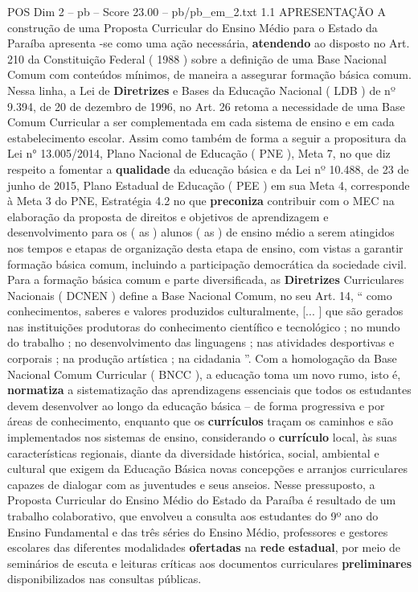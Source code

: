 \begin{textsample}{POS Dim 2 – pb – Score 23.00 – pb/pb\_em\_2.txt}  \label{ex:f2_pos_271}
1.1 APRESENTAÇÃO A construção de uma Proposta Curricular do Ensino Médio para o Estado da Paraíba apresenta -se como uma ação necessária, \textbf{atendendo} ao disposto no Art. 210 da Constituição Federal ( 1988 ) sobre a definição de uma Base Nacional Comum com conteúdos mínimos, de maneira a assegurar formação básica comum.
Nessa linha, a Lei de \textbf{Diretrizes} e Bases da Educação Nacional ( LDB ) de nº 9.394, de 20 de dezembro de 1996, no Art. 26 retoma a necessidade de uma Base Comum Curricular a ser complementada em cada sistema de ensino e em cada estabelecimento escolar.
Assim como também de forma a seguir a propositura da Lei n{\EmojiFont °} 13.005/2014, Plano Nacional de Educação ( PNE ), Meta 7, no que diz respeito a fomentar a \textbf{qualidade} da educação básica e da Lei nº 10.488, de 23 de junho de 2015, Plano Estadual de Educação ( PEE ) em sua Meta 4, corresponde à Meta 3 do PNE, Estratégia 4.2 no que \textbf{preconiza} contribuir com o MEC na elaboração da proposta de direitos e objetivos de aprendizagem e desenvolvimento para os ( as ) alunos ( as ) de ensino médio a serem atingidos nos tempos e etapas de organização desta etapa de ensino, com vistas a garantir formação básica comum, incluindo a participação democrática da sociedade civil.
Para a formação básica comum e parte diversificada, as \textbf{Diretrizes} Curriculares Nacionais ( DCNEN ) define a Base Nacional Comum, no seu Art. 14, “ como conhecimentos, saberes e valores produzidos culturalmente, [... ] que são gerados nas instituições produtoras do conhecimento científico e tecnológico ; no mundo do trabalho ; no desenvolvimento das linguagens ; nas atividades desportivas e corporais ; na produção artística ; na cidadania ”.
Com a homologação da Base Nacional Comum Curricular ( BNCC ), a educação toma um novo rumo, isto é, \textbf{normatiza} a sistematização das aprendizagens essenciais que todos os estudantes devem desenvolver ao longo da educação básica – de forma progressiva e por áreas de conhecimento, enquanto que os \textbf{currículos} traçam os caminhos e são implementados nos sistemas de ensino, considerando o \textbf{currículo} local, às suas características regionais, diante da diversidade histórica, social, ambiental e cultural que exigem da Educação Básica novas concepções e arranjos curriculares capazes de dialogar com as juventudes e seus anseios.
Nesse pressuposto, a Proposta Curricular do Ensino Médio do Estado da Paraíba é resultado de um trabalho colaborativo, que envolveu a consulta aos estudantes do 9º ano do Ensino Fundamental e das três séries do Ensino Médio, professores e gestores escolares das diferentes modalidades \textbf{ofertadas} na \textbf{rede} \textbf{estadual}, por meio de seminários de escuta e leituras críticas aos documentos curriculares \textbf{preliminares} disponibilizados nas consultas públicas.

\end{textsample}
